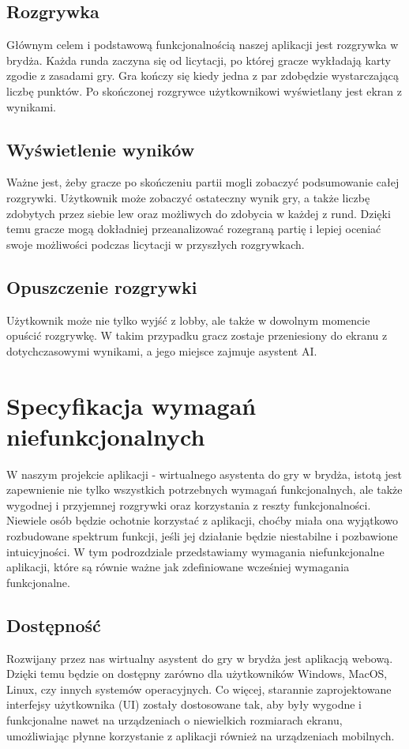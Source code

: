 \subsection{Rozgrywka}
Głównym celem i podstawową funkcjonalnością naszej aplikacji jest rozgrywka w brydża. Każda runda zaczyna się od licytacji, po której gracze wykładają karty zgodie z zasadami gry. Gra kończy się kiedy jedna z par zdobędzie wystarczającą liczbę punktów. Po skończonej rozgrywce użytkownikowi wyświetlany jest ekran z wynikami.
\subsection{Wyświetlenie wyników}
Ważne jest, żeby gracze po skończeniu partii mogli zobaczyć podsumowanie całej rozgrywki. Użytkownik może zobaczyć ostateczny wynik gry, a także liczbę zdobytych przez siebie lew oraz możliwych do zdobycia w każdej z rund. Dzięki temu gracze mogą dokładniej przeanalizować rozegraną partię i lepiej oceniać swoje możliwości podczas licytacji w przyszłych rozgrywkach. 
\subsection{Opuszczenie rozgrywki}
Użytkownik może nie tylko wyjść z lobby, ale także w dowolnym momencie opuścić rozgrywkę. W takim przypadku gracz zostaje przeniesiony do ekranu z dotychczasowymi wynikami, a jego miejsce zajmuje asystent AI.

\section{Specyfikacja wymagań niefunkcjonalnych}
W naszym projekcie aplikacji - wirtualnego asystenta do gry w brydża, istotą jest zapewnienie nie tylko wszystkich potrzebnych wymagań funkcjonalnych, ale także wygodnej i przyjemnej rozgrywki oraz korzystania z reszty funkcjonalności. Niewiele osób będzie ochotnie korzystać z aplikacji, choćby miała ona wyjątkowo rozbudowane spektrum funkcji, jeśli jej działanie będzie niestabilne i pozbawione intuicyjności. W tym podrozdziale przedstawiamy wymagania niefunkcjonalne aplikacji, które są równie ważne jak zdefiniowane wcześniej wymagania funkcjonalne.
\subsection{Dostępność}
Rozwijany przez nas wirtualny asystent do gry w brydża jest aplikacją webową. Dzięki temu będzie on dostępny zarówno dla użytkowników Windows, MacOS, Linux, czy innych systemów operacyjnych. Co więcej, starannie zaprojektowane interfejsy użytkownika (UI) zostały dostosowane tak, aby były wygodne i funkcjonalne nawet na urządzeniach o niewielkich rozmiarach ekranu, umożliwiając płynne korzystanie z aplikacji również na urządzeniach mobilnych.
